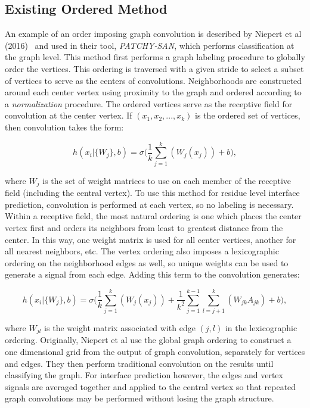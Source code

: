 \subsection{Existing Ordered Method}

An example of an order imposing graph convolution is described by Niepert et al (2016)~\cite{niepert2016} and used in their tool, \emph{PATCHY-SAN}, which performs classification at the graph level.
This method first performs a graph labeling procedure to globally order the vertices.
This ordering is traversed with a given stride to select a subset of vertices to serve as the centers of convolutions.
Neighborhoods are constructed around each center vertex using proximity to the graph and ordered according to a \emph{normalization} procedure.
The ordered vertices serve as the receptive field for convolution at the center vertex.
If $(x_1, x_2, ... , x_k)$ is the ordered set of vertices, then convolution takes the form:

\begin{equation}
h(x_i | \{ W_{j} \}, b)= \sigma \bigg( \frac{1}{k} \sum_{j=1}^{k}(W_{j} (x_j)) + b \bigg),
\label{eq:patchysan}
\end{equation}

\noindent
where ${W_j}$ is the set of weight matrices to use on each member of the receptive field (including the central vertex).
To use this method for residue level interface prediction, convolution is performed at each vertex, so no labeling is necessary. 
Within a receptive field, the most natural ordering is one which places the center vertex first and orders its neighbors from least to greatest distance from the center. 
In this way, one weight matrix is used for all center vertices, another for all nearest neighbors, etc.
The vertex ordering also imposes a lexicographic ordering on the neighborhood edges as well, so unique weights can be used to generate a signal from each edge. 
Adding this term to the convolution generates:

\begin{equation}
h(x_i | \{ W_{j} \}, b)= \sigma \bigg( \frac{1}{k} \sum_{j=1}^{k}(W_{j} (x_j)) + \frac{1}{k^2} \sum_{j = 1}^{k-1} \sum_{l=j+1}^{k}(W_{jk} A_{jk})  + b \bigg),
\label{eq:patchysan_2e}
\end{equation}

\noindent
where $W_{jl}$ is the weight matrix associated with edge $(j, l)$ in the lexicographic ordering.
Originally, Niepert et al use the global graph ordering to construct a one dimensional grid from the output of graph convolution, separately for vertices and edges.
They then perform traditional convolution on the results until classifying the graph. 
For interface prediction however, the edges and vertex signals are averaged together and applied to the central vertex so that repeated graph convolutions may be performed without losing the graph structure.


